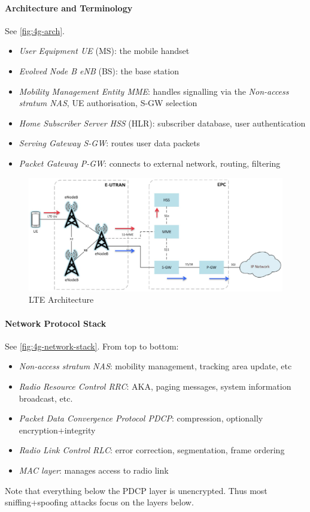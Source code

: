 \paragraph{Architecture and Terminology}
See \autoref{fig:4g-arch}.
\begin{itemize}
	\item \textit{User Equipment UE} (MS): the mobile handset
	\item \textit{Evolved Node B eNB} (BS): the base station
	\item \textit{Mobility Management Entity MME}: handles signalling via the \textit{Non-access stratum NAS}, UE authorisation, S-GW selection
	\item \textit{Home Subscriber Server HSS} (HLR): subscriber database, user authentication
	\item \textit{Serving Gateway S-GW}:  routes user data packets
	\item \textit{Packet Gateway P-GW}: connects to external network, routing, filtering
\end{itemize}

\begin{figure}[h]
	\centering
	\includegraphics[scale=0.5]{images/10-4g-arch.png}
	\caption{LTE Architecture}%
	\label{fig:4g-arch}
\end{figure}

\paragraph{Network Protocol Stack}
See \autoref{fig:4g-network-stack}. From top to bottom:
\begin{itemize}
	\item \textit{Non-access stratum NAS}: mobility management, tracking area update, etc
	\item \textit{Radio Resource Control RRC}: AKA, paging messages, system information broadcast, etc.
	\item \textit{Packet Data Convergence Protocol PDCP}: compression, optionally encryption+integrity
	\item \textit{Radio Link Control RLC}: error correction, segmentation, frame ordering
	\item \textit{MAC layer}: manages access to radio link
\end{itemize}
Note that everything below the PDCP layer is unencrypted.
Thus most sniffing+spoofing attacks focus on the layers below.


